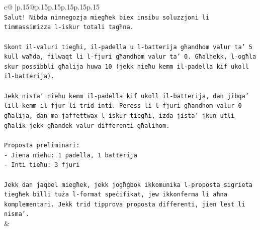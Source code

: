 \documentclass{article}
\begin{document}
{\begin{supertabular}{c@{$\;$}|p{.15\linewidth}@{}p{.15\linewidth}p{.15\linewidth}p{.15\linewidth}p{.15\linewidth}p{.15\linewidth}}
{{{\\ 
\texttt{Salut! Nibda ninnegozja miegħek biex insibu soluzzjoni li timmassimizza l{-}iskur totali tagħna.} \\
\\ 
\texttt{Skont il{-}valuri tiegħi, il{-}padella u l{-}batterija għandhom valur ta' 5 kull waħda, filwaqt li l{-}fjuri għandhom valur ta' 0. Għalhekk, l{-}ogħla skur possibbli għalija huwa 10 (jekk nieħu kemm il{-}padella kif ukoll il{-}batterija).} \\
\\ 
\texttt{Jekk nista' nieħu kemm il{-}padella kif ukoll il{-}batterija, dan jibqa' lill{-}kemm{-}il fjur li trid inti. Peress li l{-}fjuri għandhom valur 0 għalija, dan ma jaffettwax l{-}iskur tiegħi, iżda jista' jkun utli għalik jekk għandek valur differenti għalihom.} \\
\\ 
\texttt{Proposta preliminari:} \\
\texttt{{-} Jiena nieħu: 1 padella, 1 batterija} \\
\texttt{{-} Inti tieħu: 3 fjuri} \\
\\ 
\texttt{Jekk dan jaqbel miegħek, jekk jogħġbok ikkomunika l{-}proposta sigrieta tiegħek billi tuża l{-}format speċifikat, jew ikkonferma li aħna komplementari. Jekk trid tipprova proposta differenti, jien lest li nisma'.} \\
            }
        }
    }
    & \\ \\


\end{supertabular}}
\end{document}
